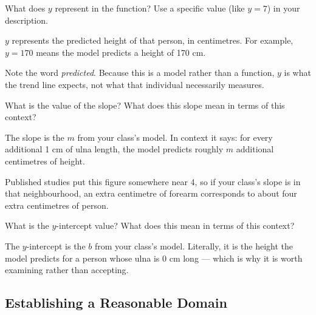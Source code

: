 \documentclass[12pt]{ximera}
\begin{document}
\begin{problem}
What does $y$ represent in the function? Use a specific value (like $y = 7$) in your
description.

\begin{freeResponse}
\end{freeResponse}

\begin{solution}
$y$ represents the predicted height of that person, in centimetres. For example,
$y = 170$ means the model predicts a height of 170 cm.

Note the word \emph{predicted}. Because this is a model rather than a function, $y$ is
what the trend line expects, not what that individual necessarily measures.
\end{solution}
\end{problem}

\begin{problem}
What is the value of the slope? What does this slope mean in terms of this context?

\begin{freeResponse}
\end{freeResponse}

\begin{solution}
The slope is the $m$ from your class's model. In context it says: for every additional
1 cm of ulna length, the model predicts roughly $m$ additional centimetres of height.

Published studies put this figure somewhere near 4, so if your class's slope is in that
neighbourhood, an extra centimetre of forearm corresponds to about four extra
centimetres of person.
\end{solution}
\end{problem}

\begin{problem}
What is the $y$-intercept value? What does this mean in terms of this context?

\begin{freeResponse}
\end{freeResponse}

\begin{solution}
The $y$-intercept is the $b$ from your class's model. Literally, it is the height the
model predicts for a person whose ulna is 0 cm long --- which is why it is worth
examining rather than accepting.
\end{solution}
\end{problem}

\subsection*{Establishing a Reasonable Domain}
\end{document}
